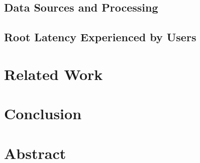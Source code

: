 \documentclass[sigconf,nonacm,10pt]{acmart}
\begin{document}
\subsection{Data Sources and
Processing}\label{data-sources-and-processing}

\subsection{Root Latency Experienced by
Users}\label{root-latency-experienced-by-users}

\section{Related Work}\label{related-work}

\section{Conclusion}\label{conclusion}

\fi

\section*{Abstract}\label{abstract-1}
\end{document}
